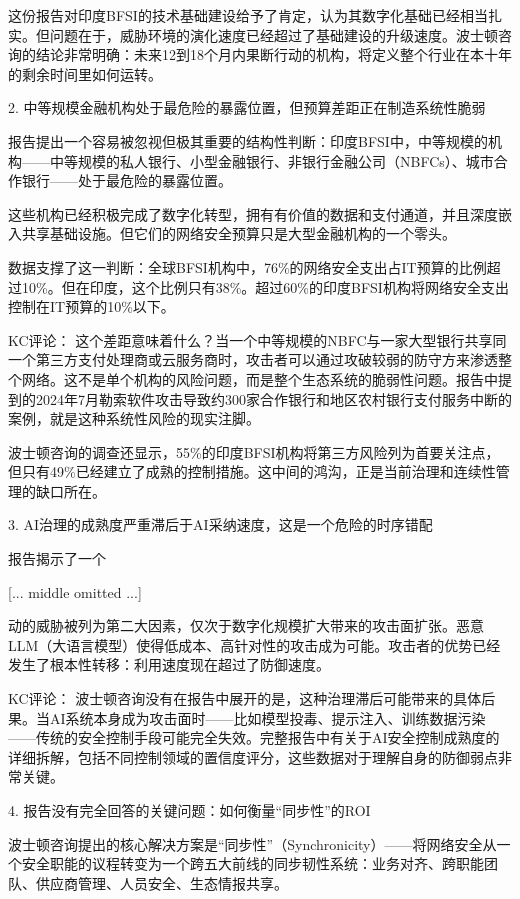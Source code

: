 \documentclass[11pt]{ctexart}
\begin{document}
这份报告对印度BFSI的技术基础建设给予了肯定，认为其数字化基础已经相当扎实。但问题在于，威胁环境的演化速度已经超过了基础建设的升级速度。波士顿咨询的结论非常明确：未来12到18个月内果断行动的机构，将定义整个行业在本十年的剩余时间里如何运转。

2. 中等规模金融机构处于最危险的暴露位置，但预算差距正在制造系统性脆弱

报告提出一个容易被忽视但极其重要的结构性判断：印度BFSI中，中等规模的机构——中等规模的私人银行、小型金融银行、非银行金融公司（NBFCs）、城市合作银行——处于最危险的暴露位置。

这些机构已经积极完成了数字化转型，拥有有价值的数据和支付通道，并且深度嵌入共享基础设施。但它们的网络安全预算只是大型金融机构的一个零头。

数据支撑了这一判断：全球BFSI机构中，76\%的网络安全支出占IT预算的比例超过10\%。但在印度，这个比例只有38\%。超过60\%的印度BFSI机构将网络安全支出控制在IT预算的10\%以下。

KC评论： 这个差距意味着什么？当一个中等规模的NBFC与一家大型银行共享同一个第三方支付处理商或云服务商时，攻击者可以通过攻破较弱的防守方来渗透整个网络。这不是单个机构的风险问题，而是整个生态系统的脆弱性问题。报告中提到的2024年7月勒索软件攻击导致约300家合作银行和地区农村银行支付服务中断的案例，就是这种系统性风险的现实注脚。

波士顿咨询的调查还显示，55\%的印度BFSI机构将第三方风险列为首要关注点，但只有49\%已经建立了成熟的控制措施。这中间的鸿沟，正是当前治理和连续性管理的缺口所在。

3. AI治理的成熟度严重滞后于AI采纳速度，这是一个危险的时序错配

报告揭示了一个

[... middle omitted ...]

动的威胁被列为第二大因素，仅次于数字化规模扩大带来的攻击面扩张。恶意LLM（大语言模型）使得低成本、高针对性的攻击成为可能。攻击者的优势已经发生了根本性转移：利用速度现在超过了防御速度。

KC评论： 波士顿咨询没有在报告中展开的是，这种治理滞后可能带来的具体后果。当AI系统本身成为攻击面时——比如模型投毒、提示注入、训练数据污染——传统的安全控制手段可能完全失效。完整报告中有关于AI安全控制成熟度的详细拆解，包括不同控制领域的置信度评分，这些数据对于理解自身的防御弱点非常关键。

4. 报告没有完全回答的关键问题：如何衡量“同步性”的ROI

波士顿咨询提出的核心解决方案是“同步性”（Synchronicity）——将网络安全从一个安全职能的议程转变为一个跨五大前线的同步韧性系统：业务对齐、跨职能团队、供应商管理、人员安全、生态情报共享。
\end{document}
